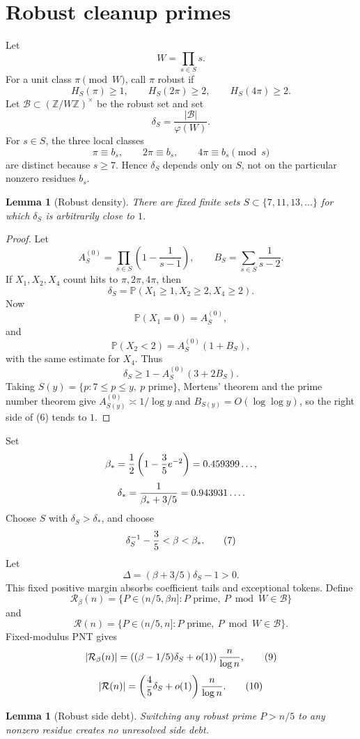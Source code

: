 \documentclass[11pt]{article}
\newtheorem{lemma}[theorem]{Lemma}
\newcommand{\Z}{\mathbb Z}
\newcommand{\R}{\mathcal R}
\newcommand{\B}{\mathcal B}
\begin{document}
\section{Robust cleanup primes}

Let
\[
  W=\prod_{s\in S}s.
\]
For a unit class $\pi\pmod W$, call $\pi$ robust if
\[
  H_S(\pi)\ge1,\qquad H_S(2\pi)\ge2,
  \qquad H_S(4\pi)\ge2.                              \tag{5}
\]
Let $\B\subset(\Z/W\Z)^\times$ be the robust set and set
\[
  \delta_S=\frac{|\B|}{\varphi(W)}.
\]
For $s\in S$, the three local classes
\[
  \pi\equiv b_s,
  \qquad 2\pi\equiv b_s,
  \qquad 4\pi\equiv b_s\pmod s
\]
are distinct because $s\ge7$.  Hence $\delta_S$ depends only on $S$, not on the
particular nonzero residues $b_s$.

\begin{lemma}[Robust density]
There are fixed finite sets $S\subset\{7,11,13,\ldots\}$ for which $\delta_S$ is
arbitrarily close to $1$.
\end{lemma}

\begin{proof}
Let
\[
  A_S^{(0)}=\prod_{s\in S}\left(1-\frac1{s-1}\right),
  \qquad
  B_S=\sum_{s\in S}\frac1{s-2}.
\]
If $X_1,X_2,X_4$ count hits to $\pi,2\pi,4\pi$, then
\[
  \delta_S=\mathbb P(X_1\ge1,X_2\ge2,X_4\ge2).
\]
Now
\[
  \mathbb P(X_1=0)=A_S^{(0)},
\]
and
\[
  \mathbb P(X_2<2)=A_S^{(0)}(1+B_S),
\]
with the same estimate for $X_4$.  Thus
\[
  \delta_S\ge1-A_S^{(0)}(3+2B_S).                    \tag{6}
\]
Taking $S(y)=\{p:7\le p\le y,\ p\text{ prime}\}$, Mertens' theorem and the
prime number theorem give $A_{S(y)}^{(0)}\asymp1/\log y$ and
$B_{S(y)}=O(\log\log y)$, so the right side of (6) tends to $1$.
\end{proof}

Set
\[
  \beta_*={1\over2}\left(1-{3\over5}e^{-2}\right)=0.459399\ldots,
\]
\[
  \delta_*={1\over \beta_*+3/5}=0.943931\ldots.
\]
Choose $S$ with $\delta_S>\delta_*$, and choose
\[
  \delta_S^{-1}-{3\over5}<\beta<\beta_*.             \tag{7}
\]
Let
\[
  \Delta=(\beta+3/5)\delta_S-1>0.                    \tag{8}
\]
This fixed positive margin absorbs coefficient tails and exceptional tokens.
Define
\[
  \R_\beta(n)=\{P\in(n/5,\beta n]:P\text{ prime},\ P\bmod W\in\B\}
\]
and
\[
  \R(n)=\{P\in(n/5,n]:P\text{ prime},\ P\bmod W\in\B\}.
\]
Fixed-modulus PNT gives
\[
  |\R_\beta(n)|=\left((\beta-1/5)\delta_S+o(1)\right){n\over\log n},
  \tag{9}
\]
\[
  |\R(n)|=\left({4\over5}\delta_S+o(1)\right){n\over\log n}.            \tag{10}
\]

\begin{lemma}[Robust side debt]
Switching any robust prime $P>n/5$ to any nonzero residue creates no unresolved
side debt.
\end{lemma}
\end{document}
